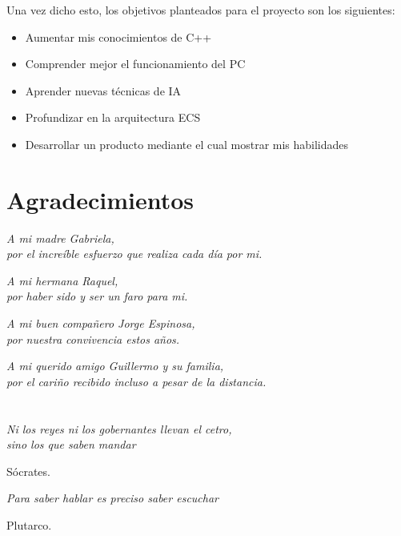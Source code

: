 Una vez dicho esto, los objetivos planteados para el proyecto son los siguientes:
\begin{itemize}
	\item Aumentar mis conocimientos de C++
	\item Comprender mejor el funcionamiento del \ac{PC}
	\item Aprender nuevas técnicas de \ac{IA}
	\item Profundizar en la arquitectura \ac{ECS}
	\item Desarrollar un producto mediante el cual mostrar mis habilidades
\end{itemize}

\cleardoublepage %
\chapter*{Agradecimientos}
\setlength{\leftmargin}{0.5\textwidth}
\setlength{\parsep}{0cm}
\addtolength{\topsep}{0.5cm}
\begin{flushright}
\small\em{
A mi madre Gabriela,\\
por el increíble esfuerzo que realiza cada día por mi. 
}
\end{flushright}
\begin{flushright}
\small\em{
A mi hermana Raquel,\\
por haber sido y ser un faro para mi. 
}
\end{flushright}
\begin{flushright}
\small\em{
A mi buen compañero Jorge Espinosa,\\
por nuestra convivencia estos años. 
}
\end{flushright}
\begin{flushright}
\small\em{
A mi querido amigo Guillermo y su familia,\\
por el cariño recibido incluso a pesar de la distancia. 
}
\end{flushright}

\cleardoublepage %
\chapter*{}
\setlength{\leftmargin}{0.5\textwidth}
\setlength{\parsep}{0cm}
\addtolength{\topsep}{0.5cm}
\begin{flushright}
\small\em{
Ni los reyes ni los gobernantes llevan el cetro,\\
sino los que saben mandar\\ 
}
\end{flushright}
\begin{flushright}
\small{
Sócrates.
}
\end{flushright}

\begin{flushright}
\small\em{
Para saber hablar es preciso saber escuchar\\
}
\end{flushright}
\begin{flushright}
\small{
Plutarco.
}
\end{flushright}
\cleardoublepage %
